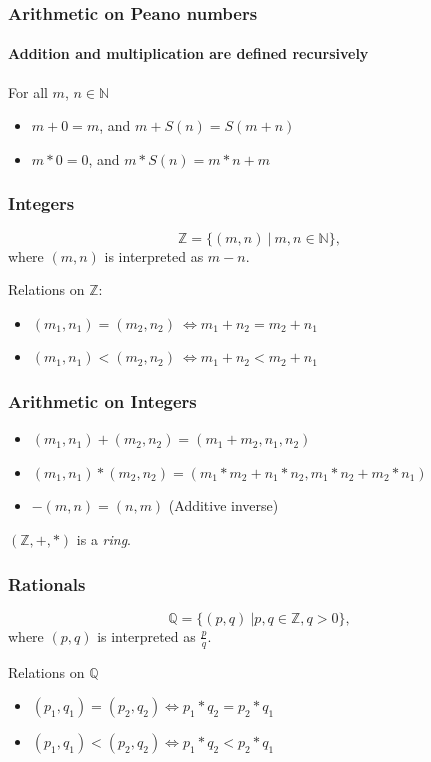 \documentclass{beamer}
\def\N{\mathbb{N}}
\def\Q{\mathbb{Q}}
\def\Z{\mathbb{Z}}
\begin{document}
\begin{frame}
    \frametitle{Arithmetic on Peano numbers}
    \framesubtitle{Addition and multiplication are defined recursively}
    For all $m$, $n \in \N$
    \begin{itemize}
        \item $m+0 = m$, and $m+S(n) = S(m+n)$
        \item $m * 0 = 0$, and $m * S(n) = m*n + m$
    \end{itemize}
\end{frame}

\begin{frame}
    \frametitle{Integers}
    $$\Z = \{ (m,n) ~|~m,n \in \N \}, $$ 
    where $(m,n)$ is interpreted as $m-n$.

    \vspace{2.5em}
    Relations on $\Z$:
    \begin{itemize}
        \item $(m_1,n_1) = (m_2,n_2) ~\Leftrightarrow m_1 + n_2 = m_2 + n_1$
        \item $(m_1,n_1) < (m_2,n_2) ~\Leftrightarrow m_1 + n_2 < m_2 + n_1$
    \end{itemize}
\end{frame}

\begin{frame}
    \frametitle{Arithmetic on Integers}
    \begin{itemize}
        \item $(m_1,n_1) + (m_2,n_2) = (m_1+m_2, n_1, n_2) $
        \item $(m_1,n_1) * (m_2,n_2) = (m_1*m_2 + n_1*n_2, m_1*n_2 + m_2*n_1)$
        \item $-(m,n) = (n,m)$ (Additive inverse)
    \end{itemize}

    \pause[2]
    \vspace{2.5em}
    $(\Z, +, *)$ is a \textit{ring}.
\end{frame}

\begin{frame}
    \frametitle{Rationals}
    $$ \Q = \{ (p,q)~| p,q \in \Z, q > 0 \}, $$
    where $(p,q)$ is interpreted as $\frac{p}{q}$.

    \vspace{2.5em}
    Relations on $\Q$
    \begin{itemize}
        \item $(p_1, q_1) = (p_2,q_2) \Leftrightarrow p_1 * q_2 = p_2 * q_1$
        \item $(p_1, q_1) < (p_2,q_2) \Leftrightarrow p_1 * q_2 < p_2 * q_1$
    \end{itemize}
\end{frame}
\end{document}
